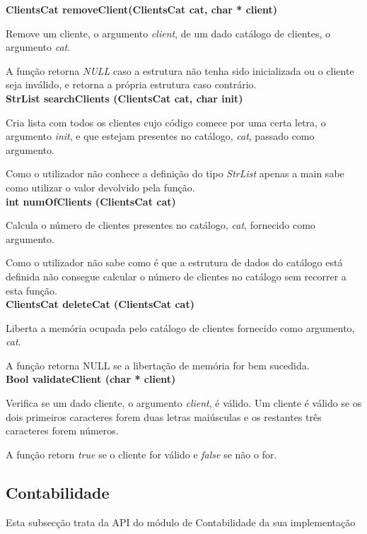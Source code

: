 \documentclass[10pt] {article}
\begin{document}
\noindent \textbf{ClientsCat removeClient(ClientsCat cat, char * client)}
\par Remove um cliente, o argumento \emph{client}, de um dado catálogo de clientes, o argumento \emph{cat}.
\par A função retorna \emph{NULL} caso a estrutura não tenha sido inicializada ou o cliente seja inválido, e
retorna a própria estrutura caso contrário. \\

\noindent \textbf{StrList searchClients (ClientsCat cat, char init)}
\par Cria lista com todos os clientes cujo código comece por uma certa letra, o argumento \emph{init}, e que
estejam presentes no catálogo, \emph{cat}, passado como argumento.
\par Como o utilizador não conhece a definição do tipo \emph{StrList} apenas a main sabe como utilizar
o valor devolvido pela função. \\

\noindent \textbf{int numOfClients (ClientsCat cat)}
\par Calcula o número de clientes presentes no catálogo, \emph{cat}, fornecido como argumento.
\par Como o utilizador não sabe como é que a estrutura de dados do catálogo está definida não consegue
calcular o número de clientes no catálogo sem recorrer a esta função. \\

\noindent \textbf{ClientsCat deleteCat (ClientsCat cat)}
\par Liberta a memória ocupada pelo catálogo de clientes fornecido como argumento, \emph{cat}.
\par A função retorna NULL se a libertação de memória for bem sucedida. \\

\noindent \textbf{Bool validateClient (char * client)}
\par Verifica se um dado cliente, o argumento \emph{client}, é válido. Um cliente é válido se os dois primeiros
caracteres forem duas letras maiúsculas e os restantes três caracteres forem números.
\par A função retorn \emph{true} se o cliente for válido e \emph{false} se não o for.



\subsection{Contabilidade}
\par Esta subsecção trata da API do módulo de Contabilidade da sua implementação
\end{document}
